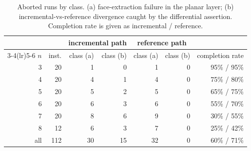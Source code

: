 \begin{table}[htbp]
\centering
\begin{tabular}{rrrrrrr}
\toprule
& & \multicolumn{2}{c}{incremental path} & \multicolumn{2}{c}{reference path} & \\
\cmidrule(lr){3-4}\cmidrule(lr){5-6}
$n$ & inst. & class (a) & class (b) & class (a) & class (b) & completion rate \\
\midrule
3 & 20 & 1 & 0 & 1 & 0 & 95\% / 95\% \\
4 & 20 & 4 & 1 & 4 & 0 & 75\% / 80\% \\
5 & 20 & 5 & 2 & 5 & 0 & 65\% / 75\% \\
6 & 20 & 6 & 3 & 6 & 0 & 55\% / 70\% \\
7 & 20 & 8 & 6 & 9 & 0 & 30\% / 55\% \\
8 & 12 & 6 & 3 & 7 & 0 & 25\% / 42\% \\
\midrule
all & 112 & 30 & 15 & 32 & 0 & 60\% / 71\% \\
\bottomrule
\end{tabular}
\caption{Aborted runs by class. (a) face-extraction failure in the planar layer; (b) incremental-vs-reference divergence caught by the differential assertion. Completion rate is given as incremental / reference.}
\label{tab:failures}
\end{table}
